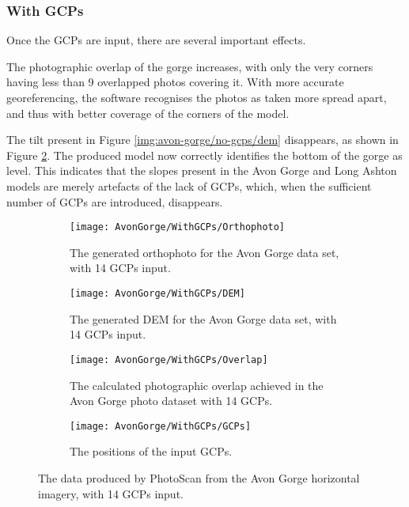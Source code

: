 \subsubsection{With GCPs}
\label{sec:results/avon-gorge/with-gcps}

Once the GCPs are input, there are several important effects.

The photographic overlap of the gorge increases, with only the very corners
having less than 9 overlapped photos covering it. With more accurate
georeferencing, the software recognises the photos as taken more spread apart,
and thus with better coverage of the corners of the model.

The tilt present in Figure \ref{img:avon-gorge/no-gcps/dem} disappears, as shown
in Figure \ref{img:avon-gorge/with-gcps/dem}. The produced model now correctly
identifies the bottom of the gorge as level. This indicates that the slopes
present in the Avon Gorge and Long Ashton models are merely artefacts of the
lack of GCPs, which, when the sufficient number of GCPs are introduced,
disappears.

\begin{figure}
    \centering
    \begin{subfigure}[b]{0.45\textwidth}
        \texttt{[image: AvonGorge/WithGCPs/Orthophoto]}
        \caption{The generated orthophoto for the Avon Gorge data set, with 14
        GCPs input.}
        \label{img:avon-gorge/with-gcps/orthophoto}
    \end{subfigure}
    \begin{subfigure}[b]{0.45\textwidth}
        \texttt{[image: AvonGorge/WithGCPs/DEM]}
        \caption{The generated DEM for the Avon Gorge data set, with 14 GCPs
        input.}
        \label{img:avon-gorge/with-gcps/dem}
    \end{subfigure}
    \begin{subfigure}[b]{0.45\textwidth}
        \texttt{[image: AvonGorge/WithGCPs/Overlap]}
        \caption{The calculated photographic overlap achieved in the Avon Gorge
        photo dataset with 14 GCPs.}
        \label{img:avon-gorge/with-gcps/overlap}
    \end{subfigure}
    \begin{subfigure}[b]{0.45\textwidth}
        \texttt{[image: AvonGorge/WithGCPs/GCPs]}
        \caption{The positions of the input GCPs.}
        \label{img:avon-gorge/with-gcps/gcps}
    \end{subfigure}
    \caption{The data produced by PhotoScan from the Avon Gorge horizontal
    imagery, with 14 GCPs input.}
    \label{img:avon-gorge/with-gcps}
\end{figure}

